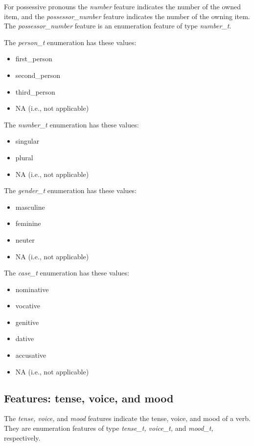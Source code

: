 \documentclass[11pt,oneside,a4paper]{memoir}
\begin{document}
For possessive pronouns the \emph{number} feature indicates the number of the owned item, and the
\emph{possessor\_number} feature indicates the number of the owning item. The
\emph{possessor\_number} feature is an enumeration feature of type \emph{number\_t}.


The \emph{person\_t} enumeration has these values:

\begin{itemize}
\item first\_person
\item second\_person
\item third\_person
\item NA (i.e., not applicable)
\end{itemize}

The \emph{number\_t} enumeration has these values:

\begin{itemize}
\item singular
\item plural
\item NA (i.e., not applicable)
\end{itemize}

The \emph{gender\_t} enumeration has these values:

\begin{itemize}
\item masculine
\item feminine
\item neuter
\item NA (i.e., not applicable)
\end{itemize}

The \emph{case\_t} enumeration has these values:

\begin{itemize}
\item nominative
\item vocative
\item genitive
\item dative
\item accusative
\item NA (i.e., not applicable)
\end{itemize}

\subsection{Features: tense, voice, and mood}

The \emph{tense, voice,} and \emph{mood} features indicate the tense, voice, and
mood of a verb. They are enumeration features of type \emph{tense\_t, voice\_t,}
and \emph{mood\_t,} respectively.
\end{document}
